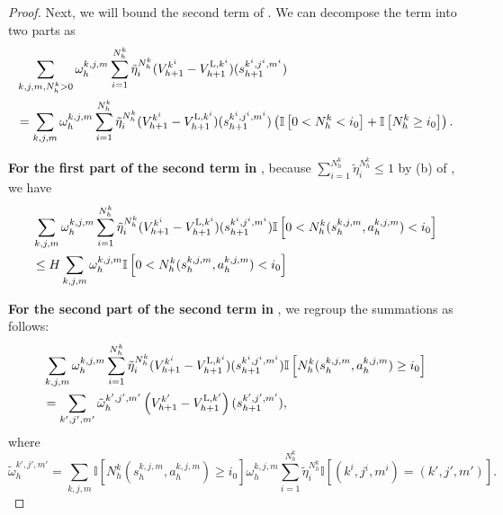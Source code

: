 \documentclass{article}
\newcommand{\LL}{\textnormal{L}}
\begin{document}
\begin{proof}
Next, we will bound the second term of . We can decompose the term into two parts as
\begin{align*}
    &\sum_{k,j,m,N_h^k>0} \omega_{h}^{k,j,m} \sum_{i = 1}^{N_h^k}\tilde{\eta}_i^{N_h^k}(V_{h+1}^{k^i} - V_{h+1}^{\LL,k^i})(s_{h+1}^{k^i,j^i,m^i})\\
    & = \sum_{k,j,m} \omega_{h}^{k,j,m} \sum_{i = 1}^{N_h^k}\tilde{\eta}_i^{N_h^k}(V_{h+1}^{k^i} -V_{h+1}^{\LL,k^i})(s_{h+1}^{k^i,j^i,m^i}) \left(\mathbb{I}\left[0<N_h^k <i_0 \right] + \mathbb{I}\left[N_h^k \geq i_0 \right]\right).
\end{align*}

\textbf{For the first part of the second term in }, because $\sum_{i = 1}^{N_h^k}\tilde{\eta}_i^{N_h^k} \leq 1$ by (b) of , we have
\begin{align}
    \label{recur21begin}
    &\sum_{k,j,m} \omega_{h}^{k,j,m} \sum_{i = 1}^{N_h^k}\tilde{\eta}_i^{N_h^k}(V_{h+1}^{k^i} - V_{h+1}^{\LL,k^i})(s_{h+1}^{k^i,j^i,m^i}) \mathbb{I}\left[0<N_h^k(s_{h}^{k,j,m},a_{h}^{k,j,m}) <i_0 \right] \nonumber\\
    &\leq H\sum_{k,j,m} \omega_{h}^{k,j,m} \mathbb{I}\left[0<N_h^k(s_{h}^{k,j,m},a_{h}^{k,j,m}) <i_0 \right] 
\end{align}

\textbf{For the second part  of the second term in }, we regroup the summations as follows:
\begin{align}
    \label{recur22begin}
    &\sum_{k,j,m} \omega_{h}^{k,j,m} \sum_{i = 1}^{N_h^k}\tilde{\eta}_i^{N_h^k}(V_{h+1}^{k^i} - V_{h+1}^{\LL,k^i})(s_{h+1}^{k^i,j^i,m^i}) \mathbb{I}\left[N_h^k(s_{h}^{k,j,m},a_{h}^{k,j,m}) \geq i_0 \right] \nonumber\\
    & = \sum_{k',j',m'}\tilde{\omega}_{h}^{k',j',m'} \left(V_{h+1}^{k'} - V_{h+1}^{\LL,k'}\right)(s_{h+1}^{k',j',m'}),
\end{align}
where
$$\tilde{\omega}_{h}^{k',j',m'} = \sum_{k,j,m}\mathbb{I}\left[N_h^k(s_{h}^{k,j,m},a_{h}^{k,j,m}) \geq i_0 \right]\omega_{h}^{k,j,m}\sum_{i = 1}^{N_h^k}\tilde{\eta}_i^{N_h^k}\mathbb{I}\left[(k^i,j^i,m^i) = (k',j',m') \right].$$


\end{proof}
\end{document}
